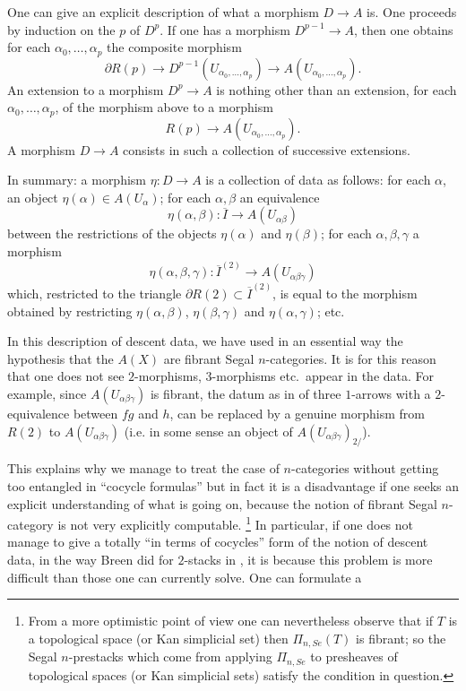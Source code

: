 One can give an explicit description of what a morphism $D\rightarrow A$ is.
One proceeds by induction on the $p$ of $D^p$. If one has a morphism
$D^{p-1}\rightarrow A$, then one obtains for each $\alpha _0,\ldots , \alpha
_p$ the composite morphism
$$
\partial R(p)\rightarrow D^{p-1}(U_{\alpha _0,\ldots ,\alpha _p})\rightarrow
A(U_{\alpha _0,\ldots ,\alpha _p}).
$$
An extension to a morphism $D^p\rightarrow A$ is nothing other than an
extension, for each $\alpha _0,\ldots , \alpha _p$, of the morphism above to a
morphism
$$
R(p)\rightarrow
A(U_{\alpha _0,\ldots ,\alpha _p}).
$$
A morphism $D\rightarrow A$ consists in such a collection of successive
extensions.

In summary: a morphism $\eta : D\rightarrow A$ is a collection of data as
follows: for each $\alpha$, an object $\eta (\alpha )\in A(U_{\alpha})$; for
each $\alpha , \beta$ an equivalence
$$
\eta (\alpha , \beta ): \overline{I}\rightarrow A(U_{\alpha \beta})
$$
between the restrictions of the objects $\eta (\alpha )$ and $\eta (\beta )$;
for each $\alpha , \beta , \gamma$ a morphism
$$
\eta (\alpha , \beta , \gamma ):
\overline{I}^{(2)}\rightarrow A(U_{\alpha \beta\gamma})
$$
which, restricted to the triangle $\partial R(2) \subset \overline{I}^{(2)}$,
is equal to the morphism obtained by restricting $\eta (\alpha ,\beta )$,
$\eta (\beta , \gamma )$ and $\eta (\alpha , \gamma )$; etc.


In this description of descent data, we have used in an essential way the
hypothesis that the $A(X)$ are fibrant Segal $n$-categories. It is for this
reason that one does not see $2$-morphisms, $3$-morphisms etc.\ appear in the
data. For example, since $A(U_{\alpha \beta \gamma})$ is fibrant, the datum as
in \cite{Breen} of three $1$-arrows with a $2$-equivalence between $fg$ and
$h$, can be replaced by a genuine morphism from $R(2)$ to
$A(U_{\alpha \beta \gamma})$ (i.e. in some sense an object of
$A(U_{\alpha \beta \gamma})_{2/}$).

This explains why we manage to treat the case of $n$-categories without
getting too entangled in ``cocycle formulas'' but in fact it is a disadvantage
if one seeks an explicit understanding of what is going on, because the notion
of fibrant Segal $n$-category is not very explicitly computable.
\footnote{
From a more optimistic point of view one can nevertheless observe that if $T$
is a topological space (or Kan simplicial set) then $\Pi _{n,Se}(T)$ is
fibrant; so the Segal $n$-prestacks which come from applying $\Pi _{n,Se}$ to
presheaves of topological spaces (or Kan simplicial sets) satisfy the
condition in question.}
In particular, if one does not manage to give a totally ``in terms of
cocycles'' form of the notion of descent data, in the way Breen did for
$2$-stacks in \cite{Breen}, it is because this problem is more difficult than
those one can currently solve. One can formulate a

